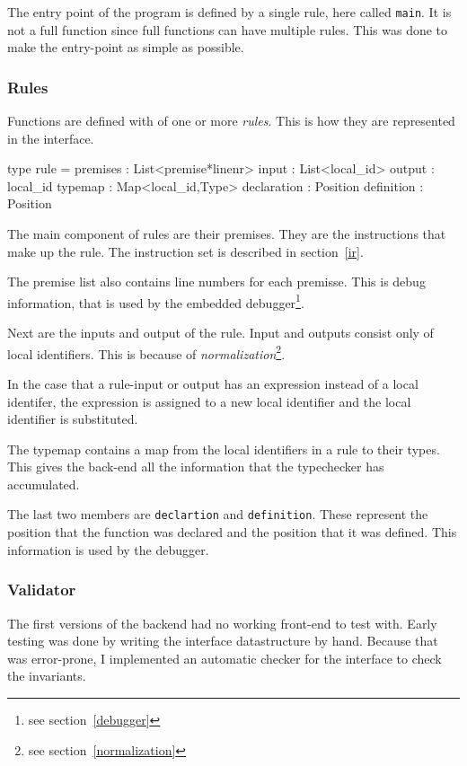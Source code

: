 The entry point of the program is defined by a single rule, here called \verb|main|.
It is not a full function since full functions can have multiple rules.
This was done to make the entry-point as simple as possible.

\subsubsection{Rules}

Functions are defined with of one or more \textit{rules}.
This is how they are represented in the interface.

\begin{FS}
type rule = {
  premises    : List<premise*linenr>
  input       : List<local_id>
  output      : local_id
  typemap     : Map<local_id,Type>
  declaration : Position
  definition  : Position
}
\end{FS}

The main component of rules are their premises.
They are the instructions that make up the rule.
The instruction set is described in section~\ref{ir}.

The premise list also contains line numbers for each premisse.
This is debug information, that is used by the embedded debugger\footnote{see section~\ref{debugger}}.

Next are the inputs and output of the rule.
Input and outputs consist only of local identifiers.
This is because of \textit{normalization}\footnote{see section~\ref{normalization}}.

In the case that a rule-input or output has an expression instead of a local identifer,
 the expression is assigned to a new local identifier and the local identifier is substituted.

The typemap contains a map from the local identifiers in a rule to their types.
This gives the back-end all the information that the typechecker has accumulated.

The last two members are \verb|declartion| and \verb|definition|.
These represent the position that the function was declared and the position that it was defined.
This information is used by the debugger.

\subsubsection{Validator}
The first versions of the backend had no working front-end to test with.
Early testing was done by writing the interface datastructure by hand.
Because that was error-prone, I implemented an automatic checker for the interface to check the invariants.

